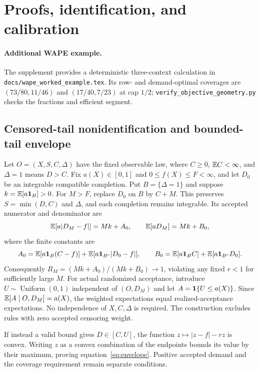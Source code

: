 \section{Proofs, identification, and calibration}
\label{app:proofs}




\paragraph{Additional WAPE example.} The supplement provides a deterministic three-context calculation in \texttt{docs/wape\_worked\_example.tex}. Its row- and demand-optimal coverages are $(73/80,11/46)$ and $(17/40,7/23)$ at cap $1/2$; \texttt{verify\_objective\_geometry.py} checks the fractions and efficient segment.

\subsection{Censored-tail nonidentification and bounded-tail envelope}
Let $O=(X,S,C,\Delta)$ have the fixed observable law, where $C\geq0$, $\mathbb{E} C<\infty$, and $\Delta=1$ means $D>C$. Fix $a(X)\in[0,1]$ and $0\leq f(X)\leq F<\infty$, and let $D_0$ be an integrable compatible completion. Put $B=\{\Delta=1\}$ and suppose $k=\mathbb{E}[a\mathbf{1}_B]>0$. For $M>F$, replace $D_0$ on $B$ by $C+M$. This preserves $S=\min(D,C)$ and $\Delta$, and each completion remains integrable. Its accepted numerator and denominator are
\[
 \mathbb{E}[a|D_M-f|]=Mk+A_0,\qquad \mathbb{E}[aD_M]=Mk+B_0,
\]
where the finite constants are
\[
 A_0=\mathbb{E}[a\mathbf{1}_B(C-f)]+\mathbb{E}[a\mathbf{1}_{B^c}|D_0-f|],\qquad
 B_0=\mathbb{E}[a\mathbf{1}_B C]+\mathbb{E}[a\mathbf{1}_{B^c}D_0].
\]
Consequently $R_M=(Mk+A_0)/(Mk+B_0)\to1$, violating any fixed $r<1$ for sufficiently large $M$. For actual randomized acceptance, introduce $U\sim\operatorname{Uniform}(0,1)$ independent of $(O,D_M)$ and let $A=\mathbf{1}\{U\leq a(X)\}$. Since $\mathbb{E}[A\mid O,D_M]=a(X)$, the weighted expectations equal realized-acceptance expectations. No independence of $X,C,\Delta$ is required. The construction excludes rules with zero accepted censoring weight.

If instead a valid bound gives $D\in[C,U]$, the function $z\mapsto|z-f|-rz$ is convex. Writing $z$ as a convex combination of the endpoints bounds its value by their maximum, proving equation~\eqref{eq:envelope}. Positive accepted demand and the coverage requirement remain separate conditions.

